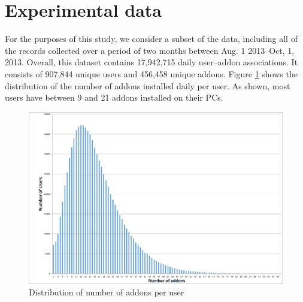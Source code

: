 \documentclass[11pt,oneside]{book}
\let\Oldsection\section
\renewcommand{\section}{\FloatBarrier\Oldsection}
\begin{document}
\section{Experimental data}

For the purposes of this study, we consider a subset of the data, including all of the records collected over a  period of two months between Aug. 1 2013--Oct, 1, 2013. Overall, this dataset contains 17,942,715 daily user--addon associations. It consists of 907,844 unique users and 456,458 unique addons. Figure \ref{fig:user_addons_histogram} shows the distribution of the number of addons installed daily per user. As shown,  most users have between 9 and 21 addons installed on their PCs.

\begin{figure}[!htbp]
\centering
\includegraphics[width=\linewidth]{figures/user_addons_histogram.png}
\caption{Distribution of number of addons per user}
\label{fig:user_addons_histogram}
\end{figure}
\end{document}
